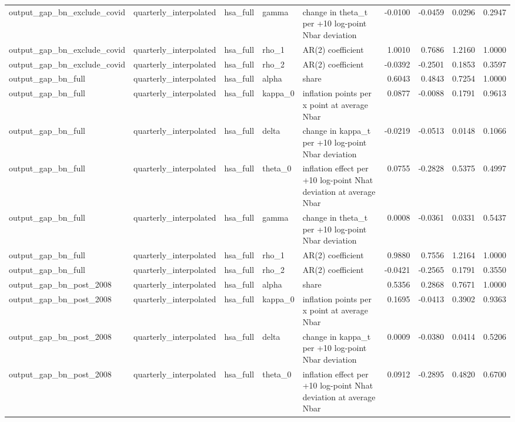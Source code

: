 \begin{tabular}{lllllrrrr}
output\_gap\_bn\_exclude\_covid & quarterly\_interpolated & hsa\_full & gamma & change in theta\_t per +10 log-point Nbar deviation & -0.0100 & -0.0459 & 0.0296 & 0.2947 \\
output\_gap\_bn\_exclude\_covid & quarterly\_interpolated & hsa\_full & rho\_1 & AR(2) coefficient & 1.0010 & 0.7686 & 1.2160 & 1.0000 \\
output\_gap\_bn\_exclude\_covid & quarterly\_interpolated & hsa\_full & rho\_2 & AR(2) coefficient & -0.0392 & -0.2501 & 0.1853 & 0.3597 \\
output\_gap\_bn\_full & quarterly\_interpolated & hsa\_full & alpha & share & 0.6043 & 0.4843 & 0.7254 & 1.0000 \\
output\_gap\_bn\_full & quarterly\_interpolated & hsa\_full & kappa\_0 & inflation points per x point at average Nbar & 0.0877 & -0.0088 & 0.1791 & 0.9613 \\
output\_gap\_bn\_full & quarterly\_interpolated & hsa\_full & delta & change in kappa\_t per +10 log-point Nbar deviation & -0.0219 & -0.0513 & 0.0148 & 0.1066 \\
output\_gap\_bn\_full & quarterly\_interpolated & hsa\_full & theta\_0 & inflation effect per +10 log-point Nhat deviation at average Nbar & 0.0755 & -0.2828 & 0.5375 & 0.4997 \\
output\_gap\_bn\_full & quarterly\_interpolated & hsa\_full & gamma & change in theta\_t per +10 log-point Nbar deviation & 0.0008 & -0.0361 & 0.0331 & 0.5437 \\
output\_gap\_bn\_full & quarterly\_interpolated & hsa\_full & rho\_1 & AR(2) coefficient & 0.9880 & 0.7556 & 1.2164 & 1.0000 \\
output\_gap\_bn\_full & quarterly\_interpolated & hsa\_full & rho\_2 & AR(2) coefficient & -0.0421 & -0.2565 & 0.1791 & 0.3550 \\
output\_gap\_bn\_post\_2008 & quarterly\_interpolated & hsa\_full & alpha & share & 0.5356 & 0.2868 & 0.7671 & 1.0000 \\
output\_gap\_bn\_post\_2008 & quarterly\_interpolated & hsa\_full & kappa\_0 & inflation points per x point at average Nbar & 0.1695 & -0.0413 & 0.3902 & 0.9363 \\
output\_gap\_bn\_post\_2008 & quarterly\_interpolated & hsa\_full & delta & change in kappa\_t per +10 log-point Nbar deviation & 0.0009 & -0.0380 & 0.0414 & 0.5206 \\
output\_gap\_bn\_post\_2008 & quarterly\_interpolated & hsa\_full & theta\_0 & inflation effect per +10 log-point Nhat deviation at average Nbar & 0.0912 & -0.2895 & 0.4820 & 0.6700 \\

\end{tabular}
